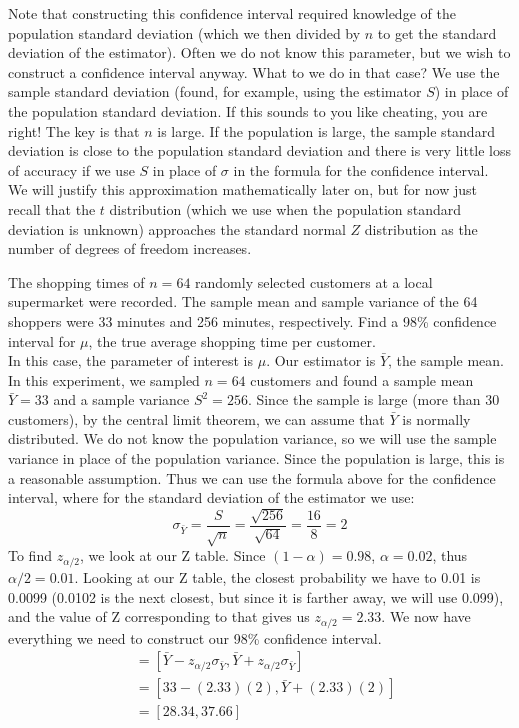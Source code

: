 \documentclass[notes.tex]{subfiles}
\begin{document}
Note that constructing this confidence interval required knowledge of the population standard deviation (which we then divided by $n$ to get the standard deviation of the estimator). Often we do not know this parameter, but we wish to construct a confidence interval anyway. What to we do in that case? We use the sample standard deviation (found, for example, using the estimator $S$) in place of the population standard deviation. If this sounds to you like cheating, you are right! The key is that $n$ is large. If the population is large, the sample standard deviation is close to the population standard deviation and there is very little loss of accuracy if we use $S$ in place of $\sigma$ in the formula for the confidence interval. We will justify this approximation mathematically later on, but for now just recall that the $t$ distribution (which we use when the population standard deviation is unknown) approaches the standard normal $Z$ distribution as the number of degrees of freedom increases.

\begin{example}The shopping times of $n = 64$ randomly selected customers at a local supermarket were recorded. The sample mean and sample variance of the 64 shoppers were 33 minutes and 256 minutes, respectively. Find a 98\% confidence interval for $\mu$, the true average shopping time per customer.\\

In this case, the parameter of interest is $\mu$. Our estimator is $\bar{Y}$, the sample mean. In this experiment, we sampled $n = 64$ customers and found a sample mean $\bar{Y} = 33$ and a sample variance $S^2 = 256$. Since the sample is large (more than 30 customers), by the central limit theorem, we can assume that $\bar{Y}$ is normally distributed. We do not know the population variance, so we will use the sample variance in place of the population variance. Since the population is large, this is a reasonable assumption. Thus we can use the formula above for the confidence interval, where for the standard deviation of the estimator we use:
\[
\sigma_{\bar{Y}} = \frac{S}{\sqrt{n}} = \frac{\sqrt{256}}{\sqrt{64}} = \frac{16}{8} = 2
\]
To find $z_{\alpha/2}$, we look at our Z table. Since $(1 - \alpha) = 0.98$, $\alpha = 0.02$, thus $\alpha/2 = 0.01$. Looking at our Z table, the closest probability we have to 0.01 is 0.0099 (0.0102 is the next closest, but since it is farther away, we will use 0.099), and the value of Z corresponding to that gives us $z_{\alpha/2} = 2.33$. We now have everything we need to construct our 98\% confidence interval.
\begin{align*}
[\bar{Y}_L, \bar{Y}_U] &= [ \bar{Y} - z_{\alpha/2} \sigma_{\bar{Y}}, \bar{Y} + z_{\alpha/2} \sigma_{\bar{Y}} ] \\
&= [ 33 - (2.33)(2), \bar{Y} + (2.33)(2) ] \\
&= [28.34, 37.66]
\end{align*}
\end{example}
\end{document}
